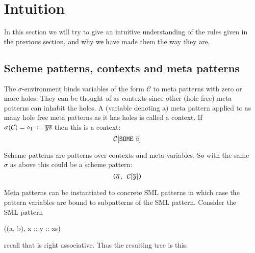 \section{Intuition}
In this section we will try to give an intuitive understanding of the rules
given in the previous section, and why we have made them the way they are.

\subsection{Scheme patterns, contexts and meta patterns}
The $\sigma$-environment binds variables of the form $\mathcal{C}$ to meta
patterns with zero or more holes. They can be thought of as contexts since other
(hole free) meta patterns can inhabit the holes. A (variable denoting a) meta
pattern applied to as many hole free meta patterns as it has holes is called a
context. If $\sigma(\mathcal{C}) = \diamond_1\ \ttt{::}\ \ol{ys}$ then this is a
context:
\[
\mathcal{C}[\texttt{SOME}\ \overline{a}]
\]

Scheme patterns are patterns over contexts and meta variables. So with the same
$\sigma$ as above this could be a scheme pattern:
\[
\texttt{($\overline{a}$, $\mathcal{C}[\overline{y}]$)}
\]

Meta patterns can be instantiated to concrete SML patterns in which case the
pattern variables are bound to subpatterns of the SML pattern. Consider the SML
pattern
\begin{sml}
((a, b), x :: y :: xs)
\end{sml}
recall that \ttt{::} is right associative. Thus the resulting tree is this:
\begin{center}
\end{center}

